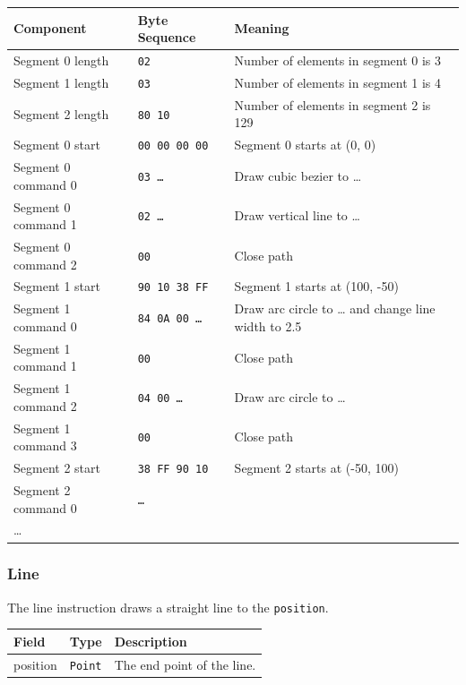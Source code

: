 \documentclass[]{article}
\begin{document}
\begin{longtable}[]{@{}p{1.5in}p{1in}p{3.5in}@{}}
  \toprule
  Component & Byte Sequence & Meaning \\
  \midrule
  \endhead
  Segment 0 length    & \texttt{02}                & Number of elements in segment 0 is 3 \\
  Segment 1 length    & \texttt{03}                & Number of elements in segment 1 is 4 \\
  Segment 2 length    & \texttt{80 10}             & Number of elements in segment 2 is 129 \\
  Segment 0 start     & \texttt{00 00 00 00}       & Segment 0 starts at (0, 0) \\
  Segment 0 command 0 & \texttt{03 \ldots}         & Draw cubic bezier to \ldots{}\\
  Segment 0 command 1 & \texttt{02 \ldots}         & Draw vertical line to \ldots{}\\
  Segment 0 command 2 & \texttt{00}                & Close path \\
  Segment 1 start     & \texttt{90 10 38 FF}       & Segment 1 starts at (100, -50) \\
  Segment 1 command 0 & \texttt{84 0A 00 \ldots{}} & Draw arc circle to \ldots{} and change line width to 2.5 \\
  Segment 1 command 1 & \texttt{00}                & Close path  \\
  Segment 1 command 2 & \texttt{04 00 \ldots{}}    & Draw arc circle to \ldots{} \\
  Segment 1 command 3 & \texttt{00}                & Close path \\
  Segment 2 start     & \texttt{38 FF 90 10}       & Segment 2 starts at (-50, 100) \\
  Segment 2 command 0 & \texttt{\ldots}            &  \\
  \ldots              & & \\
  \bottomrule
  \end{longtable}

\hypertarget{line-1}{\subsubsection{Line}\label{line-1}}

The line instruction draws a straight line to the \texttt{position}.

\begin{longtable}[]{@{}p{1in}p{0.5in}p{4.5in}@{}}
\toprule
Field & Type & Description \\
\midrule
\endhead
position & \texttt{Point} & The end point of the line. \\
\bottomrule
\end{longtable}
\end{document}
